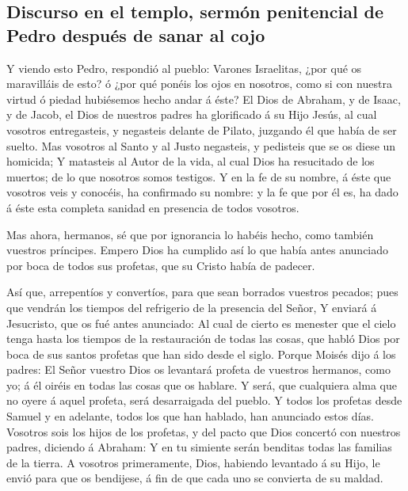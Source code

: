 \hypertarget{discurso-en-el-templo-sermuxf3n-penitencial-de-pedro-despuuxe9s-de-sanar-al-cojo}{%
\subsection{Discurso en el templo, sermón penitencial de Pedro después
de sanar al
cojo}\label{discurso-en-el-templo-sermuxf3n-penitencial-de-pedro-despuuxe9s-de-sanar-al-cojo}}

 Y viendo esto Pedro, respondió al pueblo: Varones
Israelitas, ¿por qué os maravilláis de esto? ó ¿por qué ponéis los ojos
en nosotros, como si con nuestra virtud ó piedad hubiésemos hecho andar
á éste?  El Dios de Abraham, y de Isaac, y de Jacob, el
Dios de nuestros padres ha glorificado á su Hijo Jesús, al cual vosotros
entregasteis, y negasteis delante de Pilato, juzgando él que había de
ser suelto.  Mas vosotros al Santo y al Justo negasteis, y
pedisteis que se os diese un homicida;  Y matasteis al
Autor de la vida, al cual Dios ha resucitado de los muertos; de lo que
nosotros somos testigos.  Y en la fe de su nombre, á éste
que vosotros veis y conocéis, ha confirmado su nombre: y la fe que por
él es, ha dado á éste esta completa sanidad en presencia de todos
vosotros.

 Mas ahora, hermanos, sé que por ignorancia lo habéis
hecho, como también vuestros príncipes.  Empero Dios ha
cumplido así lo que había antes anunciado por boca de todos sus
profetas, que su Cristo había de padecer.

 Así que, arrepentíos y convertíos, para que sean borrados
vuestros pecados; pues que vendrán los tiempos del refrigerio de la
presencia del Señor,  Y enviará á Jesucristo, que os fué
antes anunciado:  Al cual de cierto es menester que el
cielo tenga hasta los tiempos de la restauración de todas las cosas, que
habló Dios por boca de sus santos profetas que han sido desde el siglo.
 Porque Moisés dijo á los padres: El Señor vuestro Dios os
levantará profeta de vuestros hermanos, como yo; á él oiréis en todas
las cosas que os hablare.  Y será, que cualquiera alma que
no oyere á aquel profeta, será desarraigada del pueblo.  Y
todos los profetas desde Samuel y en adelante, todos los que han
hablado, han anunciado estos días.  Vosotros sois los hijos
de los profetas, y del pacto que Dios concertó con nuestros padres,
diciendo á Abraham: Y en tu simiente serán benditas todas las familias
de la tierra.  A vosotros primeramente, Dios, habiendo
levantado á su Hijo, le envió para que os bendijese, á fin de que cada
uno se convierta de su maldad.

